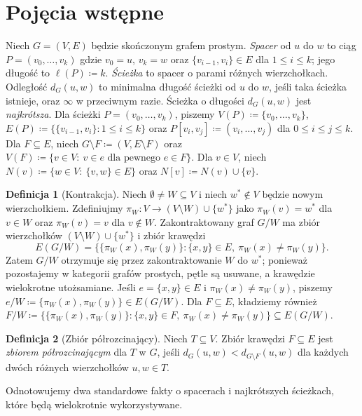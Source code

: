 \documentclass[11pt,a4paper]{amsart}
\theoremstyle{definition}
\newtheorem{definition}{Definicja}[section]
\theoremstyle{plain}
\newcommand{\len}[1]{\ell(#1)}
\newcommand{\dist}[3]{d_{#1}(#2,#3)}
\begin{document}
\section{Pojęcia wstępne}

Niech $G=(V,E)$ będzie skończonym grafem prostym. \emph{Spacer} od $u$ do $w$ to ciąg $P=(v_0,\dots,v_k)$ gdzie $v_0=u$, $v_k=w$ oraz $\{v_{i-1},v_i\}\in E$ dla $1\le i\le k$; jego długość to $\len{P}\coloneqq k$. \emph{Ścieżka} to spacer o parami różnych wierzchołkach.
Odległość $\dist{G}{u}{w}$ to minimalna długość ścieżki od $u$ do $w$, jeśli taka ścieżka istnieje, oraz $\infty$ w przeciwnym razie. Ścieżka o długości $\dist{G}{u}{w}$ jest \emph{najkrótsza}. Dla ścieżki $P=(v_0,\dots,v_k)$, piszemy $V(P)\coloneqq \{v_0,\dots,v_k\}$, $E(P)\coloneqq \bigl\{\{v_{i-1},v_i\}: 1\le i\le k\bigr\}$ oraz $P[v_i,v_j]\coloneqq (v_i,\dots,v_j)$ dla $0\le i\le j\le k$.
Dla $F\subseteq E$, niech $G\setminus F\coloneqq (V,E\setminus F)$ oraz $V(F)\coloneqq \{v\in V:\ v\in e \text{ dla pewnego } e\in F\}$. Dla $v\in V$, niech $N(v)\coloneqq \{w\in V:\ \{v,w\}\in E\}$ oraz $N[v]\coloneqq N(v)\cup\{v\}$.

\begin{definition}[Kontrakcja]\label{def:contraction}
Niech $\emptyset\neq W\subseteq V$ i niech $w^\ast\notin V$ będzie nowym wierzchołkiem.
Zdefiniujmy $\pi_W\colon V\to (V\setminus W)\cup\{w^\ast\}$ jako $\pi_W(v)=w^\ast$ dla $v\in W$ oraz $\pi_W(v)=v$ dla $v\notin W$.
Zakontraktowany graf $G/W$ ma zbiór wierzchołków $(V\setminus W)\cup\{w^\ast\}$ i zbiór krawędzi
\[
E(G/W)=\bigl\{\{\pi_W(x),\pi_W(y)\}: \{x,y\}\in E,\ \pi_W(x)\neq \pi_W(y)\bigr\}.
\]
Zatem $G/W$ otrzymuje się przez zakontraktowanie $W$ do $w^\ast$; ponieważ pozostajemy w kategorii grafów prostych, pętle są usuwane, a krawędzie wielokrotne utożsamiane.
Jeśli $e=\{x,y\}\in E$ i $\pi_W(x)\neq \pi_W(y)$, piszemy $e/W\coloneqq \{\pi_W(x),\pi_W(y)\}\in E(G/W)$.
Dla $F\subseteq E$, kładziemy również $F/W\coloneqq \bigl\{\{\pi_W(x),\pi_W(y)\}: \{x,y\}\in F,\ \pi_W(x)\neq \pi_W(y)\bigr\}\subseteq E(G/W)$.
\end{definition}

\begin{definition}[Zbiór półrozcinający]\label{def:semi-cut}
Niech $T\subseteq V$. Zbiór krawędzi $F\subseteq E$ jest \emph{zbiorem półrozcinającym} dla $T$ w $G$, jeśli $\dist{G}{u}{w}<\dist{G\setminus F}{u}{w}$ dla każdych dwóch różnych wierzchołków $u,w\in T$.
\end{definition}

\noindent Odnotowujemy dwa standardowe fakty o spacerach i najkrótszych ścieżkach, które będą wielokrotnie wykorzystywane.
\end{document}
